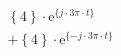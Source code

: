 \correct
\[
\begin{split}
&  \left \{ 4 \right \} \cdot \textrm{e}^{\{  j \cdot 3\pi \cdot t \}}\\
&+ \left \{ 4 \right \} \cdot \textrm{e}^{\{- j \cdot 3\pi \cdot t \}}
\end{split}
\]
